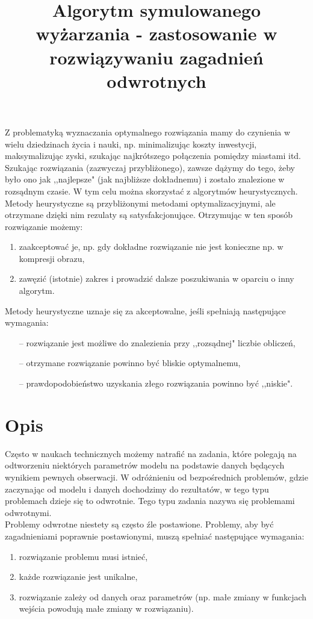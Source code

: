 \documentclass[twoside]{projektInzynierskiMS1}
\title{Algorytm symulowanego wyżarzania - zastosowanie w rozwiązywaniu zagadnień odwrotnych}
\newcommand{\si}{ś}
\begin{document}
Z problematyką wyznaczania optymalnego rozwiązania mamy do czynienia w wielu dziedzinach życia i nauki, np. minimalizując koszty inwestycji, maksymalizując zyski, szukając najkrótszego połączenia pomiędzy miastami itd. Szukając rozwiązania (zazwyczaj przybliżonego), zawsze dążymy do tego, żeby było ono jak ,,najlepsze" (jak najbliższe dokładnemu) i zostało znalezione w rozsądnym czasie. W tym celu można skorzystać z algorytmów heurystycznych. \\ 


Metody heurystyczne są przybliżonymi metodami optymalizacyjnymi, ale otrzymane dzięki nim rezulaty są satysfakcjonujące. Otrzymując w ten sposób rozwiązanie możemy:

\begin{enumerate}
	\item zaakceptować je, np. gdy dokładne rozwiązanie nie jest konieczne np. w kompresji obrazu,
	\item zawęzić (istotnie) zakres i prowadzić dalsze poszukiwania w oparciu o inny algorytm. \\
\end{enumerate}
Metody heurystyczne uznaje się za akceptowalne, jeśli spełniają następujące wymagania:
\begin{itemize}
	\item[--] rozwiązanie jest możliwe do znalezienia przy ,,rozsądnej" liczbie obliczeń,
	\item[--] otrzymane rozwiązanie powinno być bliskie optymalnemu,
	\item[--] prawdopodobieństwo uzyskania złego rozwiązania powinno być ,,niskie".
\end{itemize}

\section{Opis}
Często w naukach technicznych możemy natrafić na zadania, które polegają na odtworzeniu niektórych parametrów modelu na podstawie danych będących wynikiem pewnych obserwacji. W odróżnieniu od bezpo\si rednich problemów, gdzie zaczynając od modelu i danych dochodzimy do rezultatów, w tego typu problemach dzieje się to odwrotnie. Tego typu zadania nazywa się problemami odwrotnymi. \\

Problemy odwrotne niestety są często źle postawione. Problemy, aby być zagadnieniami poprawnie postawionymi, muszą spełniać następujące wymagania:
\begin{enumerate}
	\item rozwiązanie problemu musi istnieć,
	\item każde rozwiązanie jest unikalne,
	\item rozwiązanie zależy od danych oraz parametrów (np. małe zmiany w funkcjach wej\si cia powodują małe zmiany w rozwiązaniu). \\
\end{enumerate}
\end{document}
